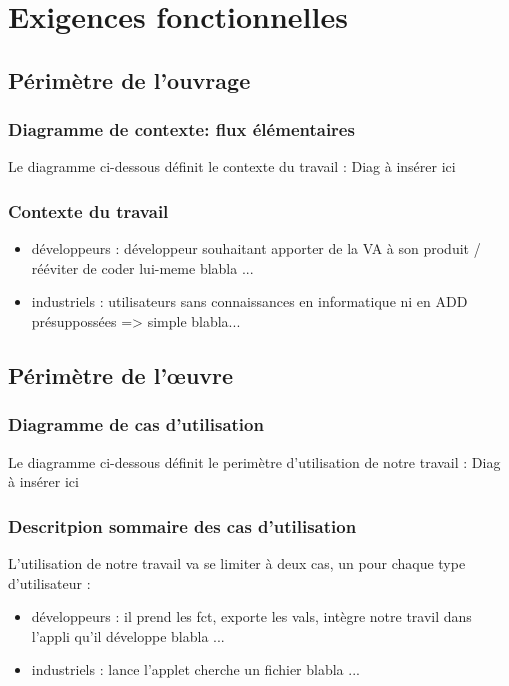 	\section{Exigences fonctionnelles}
	
		\subsection{Périmètre de l'ouvrage}
		
			\subsubsection{Diagramme de contexte: flux élémentaires}
				Le diagramme ci-dessous définit le contexte du travail :
					{\color{red}
					Diag à insérer ici
					}
			
			\subsubsection{Contexte du travail}
				\begin{itemize}
				\item développeurs : {\color{red} développeur souhaitant apporter de la VA à son produit / rééviter de coder lui-meme blabla ...}
				\item industriels : {\color{red} utilisateurs sans connaissances en informatique ni en ADD présuppossées => simple blabla...}
				\end{itemize}
				
		\subsection{Périmètre de l'œuvre}
		
			\subsubsection{Diagramme de cas d'utilisation}
				Le diagramme ci-dessous définit le perimètre d'utilisation de notre travail :
					{\color{red}
					Diag à insérer ici
					}
				
			\subsubsection{Descritpion sommaire des cas d'utilisation}
				L'utilisation de notre travail va se limiter à deux cas, un pour chaque type d'utilisateur :
				\begin{itemize}
				\item développeurs : {\color{red} il prend les fct, exporte les vals, intègre notre travil dans l'appli qu'il développe blabla ...}
				\item industriels : {\color{red} lance l'applet cherche un fichier blabla ...}
				\end{itemize}
				
